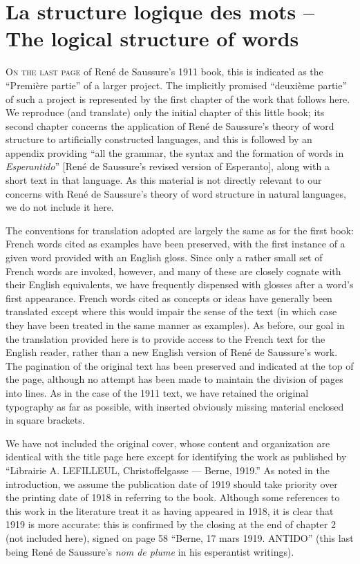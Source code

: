 
\chapter*{La structure logique des mots -- The logical structure of words}
\label{ch.1919text}

\lettrine[loversize=0.1, nindent=0em]{O}{n the last page} of René de
Saussure's 1911 book, this is indicated as the ``Première partie'' of
a larger project. The implicitly promised ``deuxième partie'' of such
a project is represented by the first chapter of the work that follows
here. We reproduce (and translate) only the initial chapter of this
little book; its second chapter concerns the application of René de
Saussure's theory of word structure to artificially constructed
languages, and this is followed by an appendix providing ``all the
grammar, the syntax and the formation of words in \emph{Esperantido}''
{[René de Saussure's revised version of Esperanto]}, along with a
short text in that language.  As this material is not directly
relevant to our concerns with René de Saussure's theory of word
structure in natural languages, we do not include it here.

The conventions for translation adopted are largely the same as for the
first book: French words cited as examples have been preserved, with
the first instance of a given word provided with an English
gloss. Since only a rather small set of French words are invoked,
however, and many of these are closely cognate with their English
equivalents, we have frequently dispensed with glosses after a word's
first appearance. French words cited as concepts or ideas have
generally been translated except where this would impair the sense of
the text (in which case they have been treated in the same manner as
examples). As before, our goal in the translation provided here is to
provide access to the French text for the English reader, rather than
a new English version of René de Saussure's work. The pagination of
the original text has been preserved and indicated at the top of the
page, although no attempt has been made to maintain the division of
pages into lines.  As in the case of the 1911 text, we have retained
the original typography as far as possible, with inserted obviously
missing material enclosed in square brackets.

We have not included the original cover, whose content and
organization are identical with the title page here except for
identifying the work as published by ``Librairie A. LEFILLEUL,
Christoffelgasse --- Berne, 1919.''  As noted in the introduction, we
assume the publication date of 1919 should take priority over the
printing date of 1918 in referring to the book. Although some
references to this work in the literature treat it as having appeared
in 1918, it is clear that 1919 is more accurate: this is confirmed by
\label{page:date.1919}
the closing at the end of chapter 2 (not included here), signed on
page 58 ``Berne, 17 mars 1919. ANTIDO'' (this last being René de
Saussure's \emph{nom de plume} in his esperantist writings).

